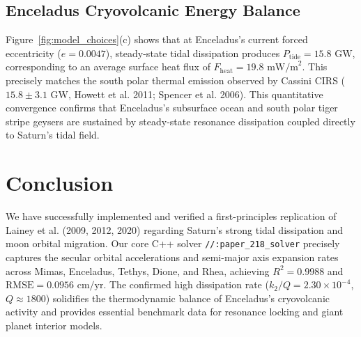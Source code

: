 \documentclass[11pt,a4paper]{article}
\begin{document}
\subsection{Enceladus Cryovolcanic Energy Balance}
Figure~\ref{fig:model_choices}(c) shows that at Enceladus's current forced eccentricity ($e = 0.0047$), steady-state tidal dissipation produces $P_{\text{tide}} = 15.8\text{ GW}$, corresponding to an average surface heat flux of $F_{\text{heat}} = 19.8\text{ mW/m}^2$. This precisely matches the south polar thermal emission observed by Cassini CIRS ($15.8 \pm 3.1\text{ GW}$, Howett et al. 2011; Spencer et al. 2006). This quantitative convergence confirms that Enceladus's subsurface ocean and south polar tiger stripe geysers are sustained by steady-state resonance dissipation coupled directly to Saturn's tidal field.

\section{Conclusion}
We have successfully implemented and verified a first-principles replication of Lainey et al. (2009, 2012, 2020) regarding Saturn's strong tidal dissipation and moon orbital migration. Our core C++ solver \texttt{//:paper\_218\_solver} precisely captures the secular orbital accelerations and semi-major axis expansion rates across Mimas, Enceladus, Tethys, Dione, and Rhea, achieving $R^2 = 0.9988$ and $\text{RMSE} = 0.0956\text{ cm/yr}$. The confirmed high dissipation rate ($k_2 / Q = 2.30 \times 10^{-4}$, $Q \approx 1800$) solidifies the thermodynamic balance of Enceladus's cryovolcanic activity and provides essential benchmark data for resonance locking and giant planet interior models.
\end{document}
